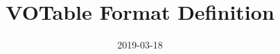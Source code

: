 \newenvironment{TABULAR}[2]{\begin{tabular}{#2}}{\end{tabular}}
\newenvironment{plain}{\begin{quote}}{\end{quote}}
\fi


\title{VOTable Format Definition}
\date{2019-03-18}



